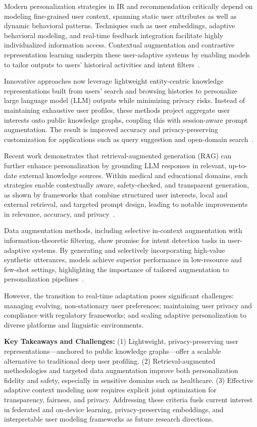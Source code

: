 \documentclass[sigconf]{acmart}
\begin{document}
Modern personalization strategies in IR and recommendation critically depend on modeling fine-grained user context, spanning static user attributes as well as dynamic behavioral patterns. Techniques such as user embeddings, adaptive behavioral modeling, and real-time feedback integration facilitate highly individualized information access. Contextual augmentation and contrastive representation learning underpin these user-adaptive systems by enabling models to tailor outputs to users' historical activities and intent filters~\cite{ref36, ref52, ref55, ref61}.

Innovative approaches now leverage lightweight entity-centric knowledge representations built from users' search and browsing histories to personalize large language model (LLM) outputs while minimizing privacy risks. Instead of maintaining exhaustive user profiles, these methods project aggregate user interests onto public knowledge graphs, coupling this with session-aware prompt augmentation. The result is improved accuracy and privacy-preserving customization for applications such as query suggestion and open-domain search~\cite{ref36, ref52, ref55}.

Recent work demonstrates that retrieval-augmented generation (RAG) can further enhance personalization by grounding LLM responses in relevant, up-to-date external knowledge sources. Within medical and educational domains, such strategies enable contextually aware, safety-checked, and transparent generation, as shown by frameworks that combine structured user interests, local and external retrieval, and targeted prompt design, leading to notable improvements in relevance, accuracy, and privacy~\cite{ref52, ref55}.

Data augmentation methods, including selective in-context augmentation with information-theoretic filtering, show promise for intent detection tasks in user-adaptive systems. By generating and selectively incorporating high-value synthetic utterances, models achieve superior performance in low-resource and few-shot settings, highlighting the importance of tailored augmentation to personalization pipelines~\cite{ref61}.

However, the transition to real-time adaptation poses significant challenges: managing evolving, non-stationary user preferences; maintaining user privacy and compliance with regulatory frameworks; and scaling adaptive personalization to diverse platforms and linguistic environments.

\textbf{Key Takeaways and Challenges:} 
(1) Lightweight, privacy-preserving user representations—anchored to public knowledge graphs—offer a scalable alternative to traditional deep user profiling.
(2) Retrieval-augmented methodologies and targeted data augmentation improve both personalization fidelity and safety, especially in sensitive domains such as healthcare.
(3) Effective adaptive context modeling now requires explicit joint optimization for transparency, fairness, and privacy. Addressing these criteria fuels current interest in federated and on-device learning, privacy-preserving embeddings, and interpretable user modeling frameworks as future research directions.
\end{document}
